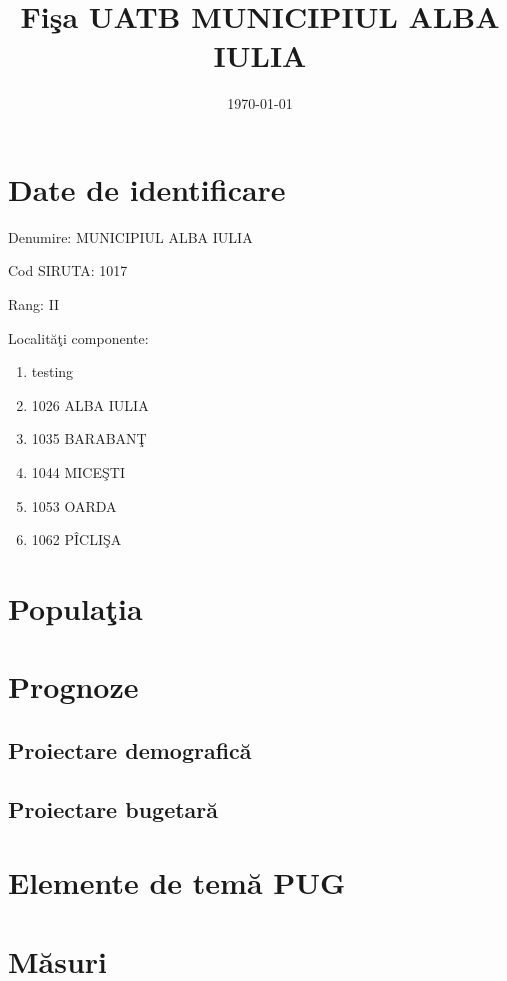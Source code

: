 \documentclass[11pt,a4paper]{scrartcl}
\begin{document}
\title{Fişa UATB MUNICIPIUL ALBA IULIA}

\date{\today}

\maketitle




\section{Date de identificare}

\begin{flushleft}

Denumire: MUNICIPIUL ALBA IULIA

Cod SIRUTA: 1017

Rang: II

Localităţi componente: 

\begin{enumerate}

\item testing

\item 1026 ALBA IULIA

\item 1035 BARABANŢ

\item 1044 MICEŞTI

\item 1053 OARDA

\item 1062 PÎCLIŞA

\end{enumerate}


\end{flushleft}


\section{Populaţia}



\section{Prognoze}


\subsection{Proiectare demografică}


\subsection{Proiectare bugetară}


\section{Elemente de temă PUG}


\section{Măsuri}
\end{document}
